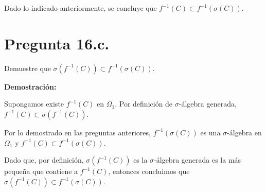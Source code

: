 \documentclass[11pt]{article}
\begin{document}
Dado lo indicado anteriormente, se concluye que $\mathit{f}^{-1} (C) \subset \mathit{f}^{-1} (\sigma(C))$.

\section{Pregunta 16.c.}

Demuestre que $\sigma(\mathit{f}^{-1}(C)) \subset \mathit{f}^{-1}(\sigma(C))$.

\textbf{Demostración:}

Supongamos existe $\mathit{f}^{-1}(C)$ en $\Omega_{1}$. Por definición de $\sigma$-álgebra generada,  $\mathit{f}^{-1}(C) \subset \sigma(\mathit{f}^{-1}(C))$.

Por lo demostrado en las preguntas anteriores, $\mathit{f}^{-1} (\sigma(C))$ es una $\sigma$-álgebra en $\Omega_{1}$ y $\mathit{f}^{-1} (C) \subset \mathit{f}^{-1} (\sigma(C))$.

Dado que, por definición, $\sigma(\mathit{f}^{-1}(C))$ es la $\sigma$-álgebra generada es la más pequeña que contiene a $\mathit{f}^{-1}(C)$, entonces concluimos que $\sigma(\mathit{f}^{-1}(C)) \subset \mathit{f}^{-1}(\sigma(C))$.
\end{document}
